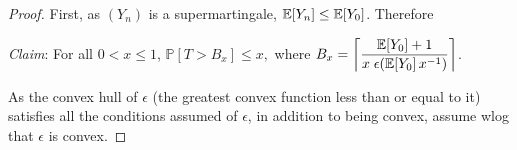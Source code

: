 \begin{proof}
First, as $(Y_n)$ is a supermartingale, $\mathbb{E}[Y_n] \leq \mathbb{E}[Y_0]$. 
Therefore
\begin{calculation}
\end{calculation}

\emph{Claim}: For all $0 < x \leq 1$, 
\(
\mathbb P[T > B_x] \leq x,
\)
where $B_x = \left \lceil \dfrac{\mathbb{E}[Y_0]+1}{x \; \epsilon(\mathbb{E}[Y_0] \, x^{-1})} \right \rceil$. 

\smallskip

As the convex hull of $\epsilon$ (the greatest convex function less than or equal to it) satisfies all the conditions assumed of $\epsilon$, in addition to being convex, assume wlog that $\epsilon$ is convex.


\end{proof}
